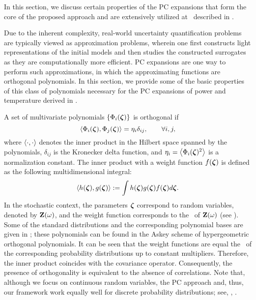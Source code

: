 In this section, we discuss certain properties of the PC expansions that form the core of the proposed approach and are extensively utilized at \ described in .

Due to the inherent complexity, real-world uncertainty quantification problems are typically viewed as approximation problems, wherein one first constructs light representations of the initial models and then studies the constructed surrogates as they are computationally more efficient.
PC expansions \cite{xiu2010} are one way to perform such approximations, in which the approximating functions are orthogonal polynomials.
In this section, we provide some of the basic properties \cite{xiu2010, maitre2010} of this class of polynomials necessary for the PC expansions of power and temperature derived in .

A set of multivariate polynomials $\{ \Phi_i(\boldsymbol{\zeta}) \}$ is orthogonal if
\begin{equation} \elabel{orthogonality}
  \oInner{\pcb_i(\vz)}{\pcb_j(\vz)} = \pcn_i \delta_{ij}, \qquad \forall i, j,
\end{equation}
where $\oInner{\cdot}{\cdot}$ denotes the inner product in the Hilbert space spanned by the polynomials, $\delta_{ij}$ is the Kronecker delta function, and $\pcn_i = \oInner{\pcb_i(\vz)^2}$ is a normalization constant.
The inner product with a weight function $f(\boldsymbol{\zeta})$ is defined as the following multidimensional integral:
\begin{equation} \elabel{inner-product}
  \oInner{h(\vz)}{g(\vz)} := \int h(\vz) g(\vz) \fPDF(\vz) d\vz.
\end{equation}
In the stochastic context, the parameters $\boldsymbol{\zeta}$ correspond to random variables, denoted by $\mathbf{Z}(\omega)$, and the weight function corresponds to the \pdf\ of $\mathbf{Z}(\omega)$ (see ).
Some of the standard distributions and the corresponding polynomial bases are given in  \cite{eldred2008}; these polynomials can be found in the Askey scheme \cite{xiu2010} of hypergeometric orthogonal polynomials.
It can be seen that the weight functions are equal the \pdfs\ of the corresponding probability distributions up to constant multipliers.
Therefore, the inner product coincides with the covariance operator.
Consequently, the presence of orthogonality is equivalent to the absence of correlations.
Note that, although we focus on continuous random variables, the PC approach and, thus, our framework work equally well for discrete probability distributions; see, \eg, \cite{xiu2010, maitre2010}.
